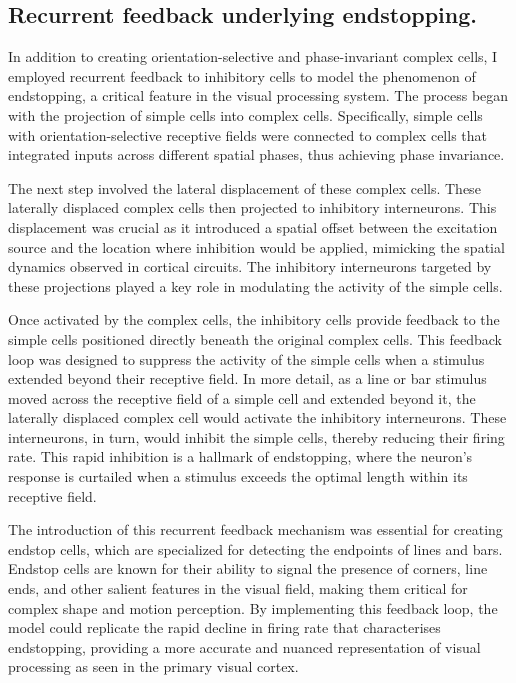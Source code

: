 \documentclass[12pt]{article}
\begin{document}
\subsection{Recurrent feedback underlying endstopping.}
In addition to creating orientation-selective and phase-invariant complex cells, I employed recurrent feedback to inhibitory cells to model the phenomenon of endstopping, a critical feature in the visual processing system. The process began with the projection of simple cells into complex cells. Specifically, simple cells with orientation-selective receptive fields were connected to complex cells that integrated inputs across different spatial phases, thus achieving phase invariance.

The next step involved the lateral displacement of these complex cells. These laterally displaced complex cells then projected to inhibitory interneurons. This displacement was crucial as it introduced a spatial offset between the excitation source and the location where inhibition would be applied, mimicking the spatial dynamics observed in cortical circuits. The inhibitory interneurons targeted by these projections played a key role in modulating the activity of the simple cells.

Once activated by the complex cells, the inhibitory cells provide feedback to the simple cells positioned directly beneath the original complex cells. This feedback loop was designed to suppress the activity of the simple cells when a stimulus extended beyond their receptive field. In more detail, as a line or bar stimulus moved across the receptive field of a simple cell and extended beyond it, the laterally displaced complex cell would activate the inhibitory interneurons. These interneurons, in turn, would inhibit the simple cells, thereby reducing their firing rate. This rapid inhibition is a hallmark of endstopping, where the neuron's response is curtailed when a stimulus exceeds the optimal length within its receptive field.

The introduction of this recurrent feedback mechanism was essential for creating endstop cells, which are specialized for detecting the endpoints of lines and bars. Endstop cells are known for their ability to signal the presence of corners, line ends, and other salient features in the visual field, making them critical for complex shape and motion perception. By implementing this feedback loop, the model could replicate the rapid decline in firing rate that characterises endstopping, providing a more accurate and nuanced representation of visual processing as seen in the primary visual cortex.
\end{document}
